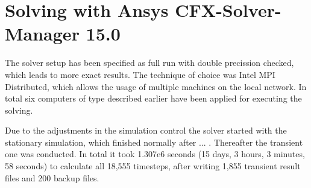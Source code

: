 \section{Solving with Ansys CFX-Solver-Manager 15.0}
The solver setup has been specified as full run with double precission checked, which leads to more exact results. The technique of choice was Intel MPI Distributed, which allows the usage of multiple machines on the local network. In total six computers of type described earlier have been applied for executing the solving. 

Due to the adjustments in the simulation control the solver started with the stationary simulation, which finished normally after ... . Thereafter the transient one was conducted. In total it took 1.307e6 seconds (15 days, 3 hours, 3 minutes, 58 seconds) to calculate all 18,555 timesteps, after writing 1,855 transient result files and 200 backup files.




